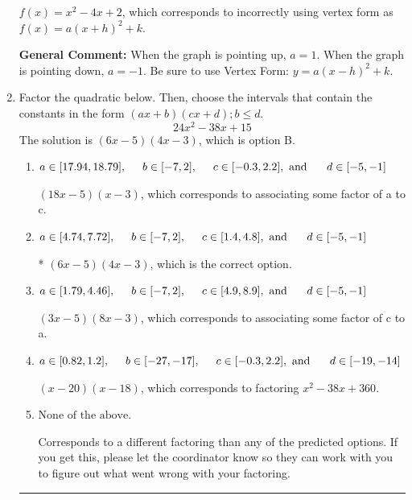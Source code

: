 \documentclass{extbook}[14pt]
\newcommand{\litem}[1]{\item #1

\rule{\textwidth}{0.4pt}}
\begin{document}
\begin{enumerate}
{\begin{enumerate}[label=\Alph*.]
$f(x)=x^{2} -4 x + 2$, which corresponds to incorrectly using vertex form as $f(x) = a(x+h)^2+k$.
\end{enumerate}

\textbf{General Comment:} When the graph is pointing up, $a=1$. When the graph is pointing down, $a=-1$. Be sure to use Vertex Form: $y = a(x-h)^2+k$.
}
\litem{
Factor the quadratic below. Then, choose the intervals that contain the constants in the form $(ax+b)(cx+d); b \leq d.$
\[ 24x^{2} -38 x + 15 \]The solution is \( (6x -5)(4x -3) \), which is option B.\begin{enumerate}[label=\Alph*.]
\item \( a \in [17.94, 18.79], \hspace*{5mm} b \in [-7, 2], \hspace*{5mm} c \in [-0.3, 2.2], \text{ and } \hspace*{5mm} d \in [-5, -1] \)

 $(18x -5)(x -3)$, which corresponds to associating some factor of a to c.
\item \( a \in [4.74, 7.72], \hspace*{5mm} b \in [-7, 2], \hspace*{5mm} c \in [1.4, 4.8], \text{ and } \hspace*{5mm} d \in [-5, -1] \)

* $(6x -5)(4x -3)$, which is the correct option.
\item \( a \in [1.79, 4.46], \hspace*{5mm} b \in [-7, 2], \hspace*{5mm} c \in [4.9, 8.9], \text{ and } \hspace*{5mm} d \in [-5, -1] \)

 $(3x -5)(8x -3)$, which corresponds to associating some factor of c to a.
\item \( a \in [0.82, 1.2], \hspace*{5mm} b \in [-27, -17], \hspace*{5mm} c \in [-0.3, 2.2], \text{ and } \hspace*{5mm} d \in [-19, -14] \)

 $(x -20)(x -18)$, which corresponds to factoring $x^{2} -38 x + 360$.
\item \( \text{None of the above.} \)

 Corresponds to a different factoring than any of the predicted options. If you get this, please let the coordinator know so they can work with you to figure out what went wrong with your factoring.
\end{enumerate}

}
\end{enumerate}
\end{document}
